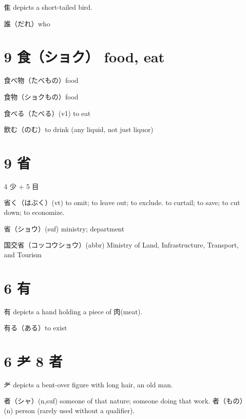 隹 depicts a short-tailed bird.

誰（だれ）who

\section{9 食（ショク） food, eat}

食べ物（たべもの）food

食物（ショクもの）food

食べる（たべる）(v1) to eat

飲む（のむ）to drink (any liquid, not just liquor)

\section{9 省}

4 少 + 5 目

省く（はぶく）(vt)
to omit; to leave out; to exclude.
to curtail; to save; to cut down; to economize.

省（ショウ）(suf) ministry; department

国交省（コッコウショウ）(abbr)
Ministry of Land, Infrastructure, Transport, and Tourism

\section{6 有}

有 depicts a hand holding a piece of 肉(meat).

有る（ある）to exist

\section{6 耂 8 者}

耂 depicts a bent-over figure with long hair, an old man.

者（シャ）(n,suf) someone of that nature; someone doing that work.
者（もの）(n) person (rarely used without a qualifier).
